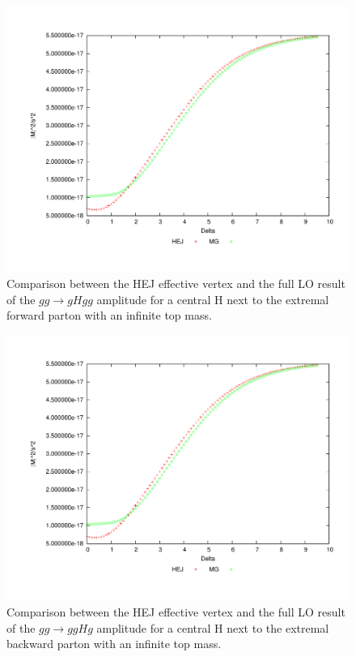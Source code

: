 \begin{figure}[H]
\centering
\includegraphics[scale=0.47]{Images/gg_cen1.pdf}
\caption{Comparison between the HEJ effective vertex and the full LO result of the $gg \to gHgg$ amplitude for a central H next to the extremal forward parton with an infinite top mass.}
\label{fig:gg_ggh_2}
\end{figure}

\begin{figure}[H]
\centering
\includegraphics[scale=0.43]{Images/gg_cen2.pdf}
\caption{Comparison between the HEJ effective vertex and the full LO result of the $gg \to ggHg$ amplitude for a central H next to the extremal backward parton with an infinite top mass.}
\label{fig:gg_ggh_3}
\end{figure}


